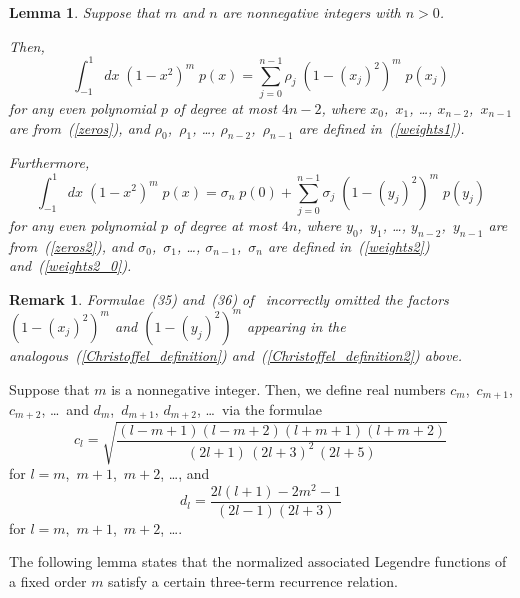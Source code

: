 \documentclass[final,3p,times]{elsarticle}
\newtheorem{lemma1}[theorem]{Lemma}
\newtheorem{remark1}[theorem]{Remark}
\newenvironment{lemma}{\begin{lemma1}}{\end{lemma1}}
\newenvironment{remark}{\begin{remark1}\rm}{\end{remark1}}
\begin{document}
\begin{lemma}
\label{quadratures}
Suppose that $m$ and $n$ are nonnegative integers with $n > 0$.

Then,
\begin{equation}
\label{Christoffel_definition}
\int_{-1}^1 dx \; \left(1-x^2\right)^m \; p(x)
= \sum_{j=0}^{n-1} \rho_j \; \left(1-(x_j)^2\right)^m \; p(x_j)
\end{equation}
for any even polynomial $p$ of degree at most $4n-2$,
where $x_0$,~$x_1$, \dots, $x_{n-2}$,~$x_{n-1}$ are from~(\ref{zeros}),
and $\rho_0$,~$\rho_1$, \dots, $\rho_{n-2}$,~$\rho_{n-1}$
are defined in~(\ref{weights1}).

Furthermore,
\begin{equation}
\label{Christoffel_definition2}
\int_{-1}^1 dx \; \left(1-x^2\right)^m \; p(x)
= \sigma_n \; p(0)
+ \sum_{j=0}^{n-1} \sigma_j \; \left(1-(y_j)^2\right)^m \; p(y_j)
\end{equation}
for any even polynomial $p$ of degree at most $4n$,
where $y_0$,~$y_1$, \dots, $y_{n-2}$,~$y_{n-1}$ are from~(\ref{zeros2}),
and $\sigma_0$,~$\sigma_1$, \dots, $\sigma_{n-1}$,~$\sigma_n$
are defined in~(\ref{weights2}) and~(\ref{weights2_0}).
\end{lemma}

\begin{remark}
Formulae~(35) and~(36) of~\cite{tygert_sph} incorrectly
omitted the factors $(1-(x_j)^2)^m$ and $(1-(y_j)^2)^m$
appearing in the analogous~(\ref{Christoffel_definition})
and~(\ref{Christoffel_definition2}) above.
\end{remark}


Suppose that $m$ is a nonnegative integer.
Then, we define real numbers $c_m$,~$c_{m+1}$, $c_{m+2}$, \dots\
and $d_m$,~$d_{m+1}$, $d_{m+2}$, \dots\ via the formulae
\begin{equation}
\label{c_rec}
c_l = \sqrt{\frac{(l-m+1)(l-m+2)(l+m+1)(l+m+2)}
           {(2l+1) \, (2l+3)^2 \, (2l+5)}}
\end{equation}
for $l = m$,~$m+1$,~$m+2$, \dots, and
\begin{equation}
\label{d_rec}
d_l = \frac{2 l (l+1) - 2 m^2 - 1}{(2l-1)(2l+3)}
\end{equation}
for $l = m$,~$m+1$,~$m+2$, \dots.


The following lemma states that the normalized associated Legendre functions
of a fixed order $m$ satisfy a certain three-term recurrence relation.
\end{document}
